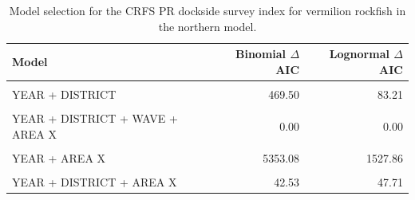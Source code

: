 \documentclass[11pt,
  english,
]{article}
\begin{document}
\begin{table}

\caption{\label{tab:tab-model-select-crfspr}Model selection for the CRFS PR dockside survey index for vermilion rockfish in the northern model.}
\centering
\begin{tabular}[t]{lrr}
\toprule
Model & Binomial $\Delta$AIC & Lognormal $\Delta$AIC\\
\midrule
\cellcolor{gray!6}{1} & \cellcolor{gray!6}{6137.96} & \cellcolor{gray!6}{1832.84}\\
YEAR + DISTRICT & 469.50 & 83.21\\
\cellcolor{gray!6}{YEAR + DISTRICT + WAVE} & \cellcolor{gray!6}{425.71} & \cellcolor{gray!6}{34.01}\\
YEAR + DISTRICT + WAVE + AREA X & 0.00 & 0.00\\
\cellcolor{gray!6}{YEAR + WAVE} & \cellcolor{gray!6}{5198.73} & \cellcolor{gray!6}{1446.58}\\
\addlinespace
YEAR + AREA X & 5353.08 & 1527.86\\
\cellcolor{gray!6}{YEAR + WAVE + AREA X} & \cellcolor{gray!6}{5024.99} & \cellcolor{gray!6}{1440.38}\\
YEAR + DISTRICT + AREA X & 42.53 & 47.71\\
\bottomrule
\end{tabular}
\end{table}

\FloatBarrier
\end{document}
